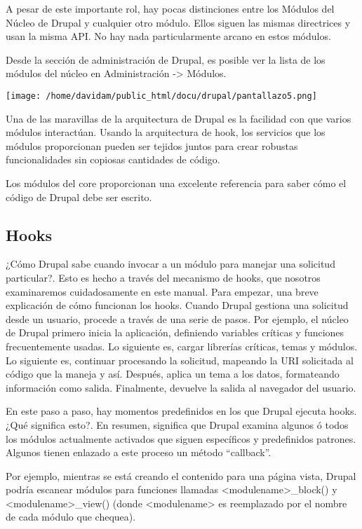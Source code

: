 \documentclass[11pt]{article}
\begin{document}
A pesar de este importante rol, hay pocas distinciones entre los
Módulos del Núcleo de Drupal y cualquier otro módulo. Ellos siguen las
mismas directrices y usan la misma API. No hay nada particularmente
arcano en estos módulos.

Desde la sección de administración de Drupal, es posible ver la lista
de los módulos del núcleo en Administración -> Módulos.

\texttt{[image: /home/davidam/public\_html/docu/drupal/pantallazo5.png]}

Una de las maravillas de la arquitectura de Drupal es la facilidad con
que varios módulos interactúan. Usando la arquitectura de hook, los
servicios que los módulos proporcionan pueden ser tejidos juntos para
crear robustas funcionalidades sin copiosas cantidades de código.

Los módulos del core proporcionan una excelente referencia para saber
cómo el código de Drupal debe ser escrito.

\subsection{Hooks}
\label{sec-2.3}


¿Cómo Drupal sabe cuando invocar a un módulo para manejar una
solicitud particular?. Esto es hecho a través del mecanismo de hooks,
que nosotros examinaremos cuidadosamente en este manual. Para empezar,
una breve explicación de cómo funcionan los hooks. Cuando Drupal
gestiona una solicitud desde un usuario, procede a través de una serie
de pasos. Por ejemplo, el núcleo de Drupal primero inicia la
aplicación, definiendo variables críticas y funciones frecuentemente
usadas. Lo siguiente es, cargar librerías críticas, temas y
módulos. Lo siguiente es, continuar procesando la solicitud, mapeando
la URI solicitada al código que la maneja y así. Después, aplica un
tema a los datos, formateando información como salida. Finalmente,
devuelve la salida al navegador del usuario.

En este paso a paso, hay momentos predefinidos en los que Drupal
ejecuta hooks. ¿Qué significa esto?. En resumen, significa que Drupal
examina algunos ó todos los módulos actualmente activados que siguen
específicos y predefinidos patrones. Algunos tienen enlazado a este
proceso un método ``callback''.

Por ejemplo, mientras se está creando el contenido para una página
vista, Drupal podría escanear módulos para funciones llamadas
<modulename>\_block() y <modulename>\_view() (donde <modulename> es
reemplazado por el nombre de cada módulo que chequea).
\end{document}
